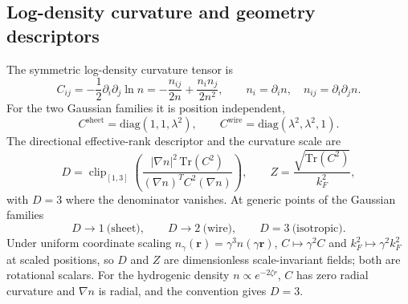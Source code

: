 \documentclass[journal=jctcce,manuscript=article]{achemso}
\DeclareMathOperator{\clip}{clip}
\begin{document}
\subsection{Log-density curvature and geometry descriptors}
The symmetric log-density curvature tensor is
\begin{equation}
C_{ij}=-\frac12\partial_i\partial_j\ln n=-\frac{n_{ij}}{2n}+\frac{n_in_j}{2n^2},
\qquad n_i=\partial_in,\quad n_{ij}=\partial_i\partial_jn.
\label{eq:dc-C}
\end{equation}
For the two Gaussian families it is position independent,
\begin{equation}
C^{\mathrm{sheet}}=\mathrm{diag}(1,1,\lambda^2),\qquad
C^{\mathrm{wire}}=\mathrm{diag}(\lambda^2,\lambda^2,1).
\label{eq:dc-Cgauss}
\end{equation}
The directional effective-rank descriptor and the curvature scale are
\begin{equation}
D=\clip_{[1,3]}\!\left(\frac{|\nabla n|^2\,\mathrm{Tr}(C^2)}{(\nabla n)^TC^2(\nabla n)}\right),
\qquad Z=\frac{\sqrt{\mathrm{Tr}(C^2)}}{k_F^2},
\label{eq:dc-DZ}
\end{equation}
with $D=3$ where the denominator vanishes.  At generic points of the Gaussian
families
\begin{equation}
D\to1\ \text{(sheet)},\qquad D\to2\ \text{(wire)},\qquad D=3\ \text{(isotropic)}.
\label{eq:dc-Dlimits}
\end{equation}
Under uniform coordinate scaling $n_\gamma(\mathbf r)=\gamma^3n(\gamma\mathbf r)$,
$C\mapsto\gamma^2C$ and $k_F^2\mapsto\gamma^2k_F^2$ at scaled positions, so $D$
and $Z$ are dimensionless scale-invariant fields; both are rotational scalars.
For the hydrogenic density $n\propto e^{-2\zeta r}$, $C$ has zero radial
curvature and $\nabla n$ is radial, and the convention gives $D=3$.
\end{document}
